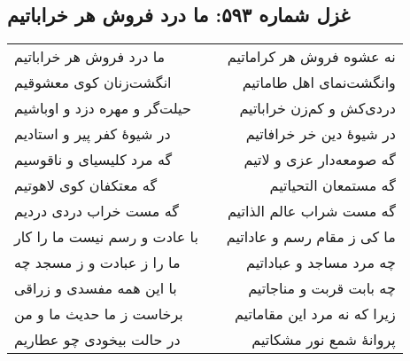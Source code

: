 \begin{center}
\section*{غزل شماره ۵۹۳: ما درد فروش هر خراباتیم}
\label{sec:593}
\begin{longtable}{l p{0.5cm} r}
ما درد فروش هر خراباتیم
&&
نه عشوه فروش هر کراماتیم
\\
انگشت‌زنان کوی معشوقیم
&&
وانگشت‌نمای اهل طاماتیم
\\
حیلت‌گر و مهره دزد و اوباشیم
&&
دردی‌کش و کم‌زن خراباتیم
\\
در شیوهٔ کفر پیر و استادیم
&&
در شیوهٔ دین خر خرافاتیم
\\
گه مرد کلیسیای و ناقوسیم
&&
گه صومعه‌دار عزی و لاتیم
\\
گه معتکفان کوی لاهوتیم
&&
گه مستمعان التحیاتیم
\\
گه مست خراب دردی دردیم
&&
گه مست شراب عالم الذاتیم
\\
با عادت و رسم نیست ما را کار
&&
ما کی ز مقام رسم و عاداتیم
\\
ما را ز عبادت و ز مسجد چه
&&
چه مرد مساجد و عباداتیم
\\
با این همه مفسدی و زراقی
&&
چه بابت قربت و مناجاتیم
\\
برخاست ز ما حدیث ما و من
&&
زیرا که نه مرد این مقاماتیم
\\
در حالت بیخودی چو عطاریم
&&
پروانهٔ شمع نور مشکاتیم
\\
\end{longtable}
\end{center}
